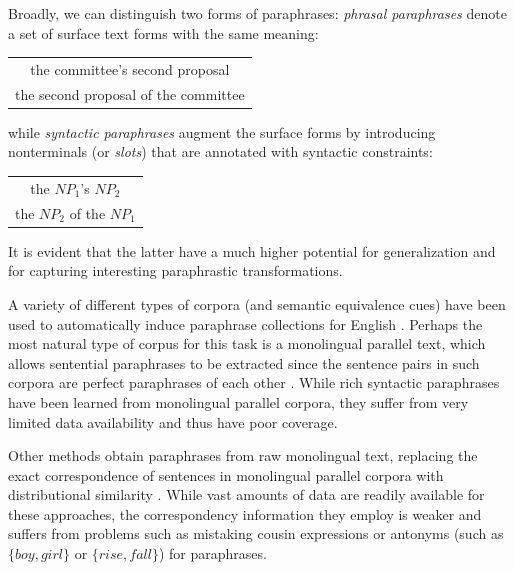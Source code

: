 \documentclass[11pt]{article}
\begin{document}
Broadly, we can distinguish two forms of paraphrases: \emph{phrasal
  paraphrases} denote a set of surface text forms with the same
meaning:
\begin{center}
\begin{tabular}{c}
the committee's second proposal \\
the second proposal of the committee
\end{tabular}
\end{center}
while \emph{syntactic paraphrases} augment the surface forms by
introducing nonterminals (or \emph{slots}) that are annotated with
syntactic constraints:
\begin{center}
\begin{tabular}{c}
the $\mathit{NP}_1$'s $\mathit{NP}_2$ \\
the $\mathit{NP}_2$ of the $\mathit{NP}_1$
\end{tabular}
\end{center}
It is evident that the latter have a much higher potential for
generalization and for capturing interesting paraphrastic transformations.

A variety of different types of corpora (and semantic equivalence
cues) have been used to automatically induce paraphrase collections
for English \cite{Madnani2010}. Perhaps the most natural type of
corpus for this task is a monolingual parallel text, which allows
sentential paraphrases to be extracted since the
sentence pairs in such corpora are perfect paraphrases of each other
\cite{Barzilay2001,Pang2003}. While rich syntactic paraphrases have
been learned from monolingual parallel corpora, they suffer from very limited data
availability and thus have poor coverage.

Other methods obtain paraphrases from raw monolingual text,
replacing the exact correspondence of sentences in monolingual
parallel corpora with distributional similarity 
\cite{Lin2001,Bhagat2008}. While vast amounts of data are readily
available for these approaches, the correspondency information they
employ is weaker 
and suffers from problems such as mistaking cousin
expressions or antonyms (such as $\{\mathit{boy}, \mathit{girl}\}$ or
$\{\mathit{rise}, \mathit{fall}\}$) for paraphrases.
\end{document}
